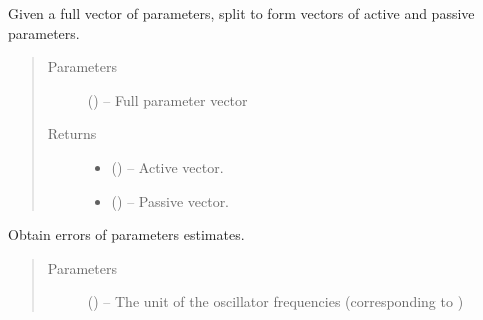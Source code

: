 \documentclass[letterpaper,10pt,english]{sphinxmanual}
\begin{document}
\begin{fulllineitems}
\begin{fulllineitems}
\label{\detokenize{references/nlp/nlp:nmrespy.nlp.nlp.NonlinearProgramming._split_active_passive}}
\sphinxAtStartPar
Given a full vector of parameters, split to form vectors of active
and passive parameters.
\begin{quote}\begin{description}
\item[{Parameters}] \leavevmode
\sphinxAtStartPar
{} () – Full parameter vector

\item[{Returns}] \leavevmode
\sphinxAtStartPar
\begin{itemize}
\item {} 
\sphinxAtStartPar
{} () – Active vector.

\item {} 
\sphinxAtStartPar
{} () – Passive vector.

\end{itemize}


\end{description}\end{quote}

\end{fulllineitems}


\begin{fulllineitems}
\label{\detokenize{references/nlp/nlp:nmrespy.nlp.nlp.NonlinearProgramming.get_errors}}
\sphinxAtStartPar
Obtain errors of parameters estimates.
\begin{quote}\begin{description}
\item[{Parameters}] \leavevmode
\sphinxAtStartPar
{} (\sphinxstyleliteralemphasis{\sphinxupquote{, }}) – The unit of the oscillator frequencies (corresponding to
)


\end{description}
\end{quote}
\end{fulllineitems}
\end{fulllineitems}
\end{document}
